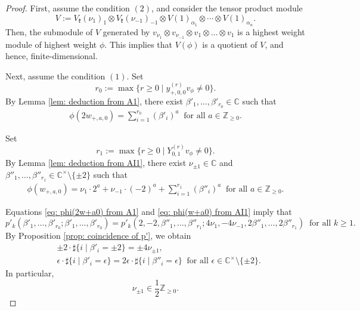 \documentclass[10pt,a4paper]{amsart}
\begin{document}
\begin{proof}
  First, assume the condition $(2)$, and consider the tensor product module
  \[
    V := V_\mathfrak{k}(\nu_1)_1 \otimes V_\mathfrak{k}(\nu_{-1})_{-1} \otimes V(1)_{\alpha_1} \otimes \cdots \otimes V(1)_{\alpha_n}.
  \]
  Then, the submodule of $V$ generated by $v_{\nu_1} \otimes v_{\nu_{-1}} \otimes v_1 \otimes \dots \otimes v_1$ is a highest weight module of highest weight $\phi$.
  This implies that $V(\phi)$ is a quotient of $V$, and hence, finite-dimensional.

  Next, assume the condition $(1)$.
  Set
  \[
    r_0 := \max\{ r \geq 0 \mid y_{+,0,0}^{(r)} v_\phi \neq 0 \}.
  \]
  By Lemma \ref{lem: deduction from A1}, there exist $\beta'_1,\dots,\beta'_{r_0} \in \mathbb{C}$ such that
  \begin{align}\label{eq: phi(2w+a0) from A1}
    \phi(2w_{+,a,0}) = \sum_{i=1}^{r_0} (\beta'_i)^a \ \text{ for all } a \in \mathbb{Z}_{\geq 0}.
  \end{align}

  Set
  \[
    r_1 := \max\{ r \geq 0 \mid Y_{0,1}^{(r)} v_\phi \neq 0 \}.
  \]
  By Lemma \ref{lem: deduction from AI1}, there exist $\nu_{\pm 1} \in \mathbb{C}$ and $\beta''_1,\dots,\beta''_{r_1} \in \mathbb{C}^\times \setminus \{ \pm 2 \}$ such that
  \begin{align}\label{eq: phi(w+a0) from AI1}
    \phi(w_{+,a,0}) = \nu_1 \cdot 2^a + \nu_{-1} \cdot (-2)^a + \sum_{i=1}^{r_1} (\beta''_i)^a \ \text{ for all } a \in \mathbb{Z}_{\geq 0}.
  \end{align}

  Equations \eqref{eq: phi(2w+a0) from A1} and \eqref{eq: phi(w+a0) from AI1} imply that
  \[
    p'_k(\beta'_1,\dots,\beta'_{r_0};\beta'_1,\dots,\beta'_{r_0}) = p'_k(2,-2,\beta''_1,\dots,\beta''_{r_1};4\nu_1,-4\nu_{-1},2\beta''_1,\dots,2\beta''_{r_1}) \ \text{ for all } k \geq 1.
  \]
  By Proposition \ref{prop: coincidence of p'}, we obtain
  \begin{align*}
    &\pm 2 \cdot \sharp\{ i \mid \beta'_i = \pm 2 \} = \pm 4\nu_{\pm 1},\\
    &\epsilon \cdot \sharp\{ i \mid \beta'_i = \epsilon \} = 2\epsilon \cdot \sharp\{ i \mid \beta''_i = \epsilon \} \ \text{ for all } \epsilon \in \mathbb{C}^\times \setminus \{ \pm 2 \}.
  \end{align*}
  In particular,
  \[
    \nu_{\pm 1} \in \frac{1}{2}\mathbb{Z}_{\geq 0}.
  \]


\end{proof}
\end{document}
